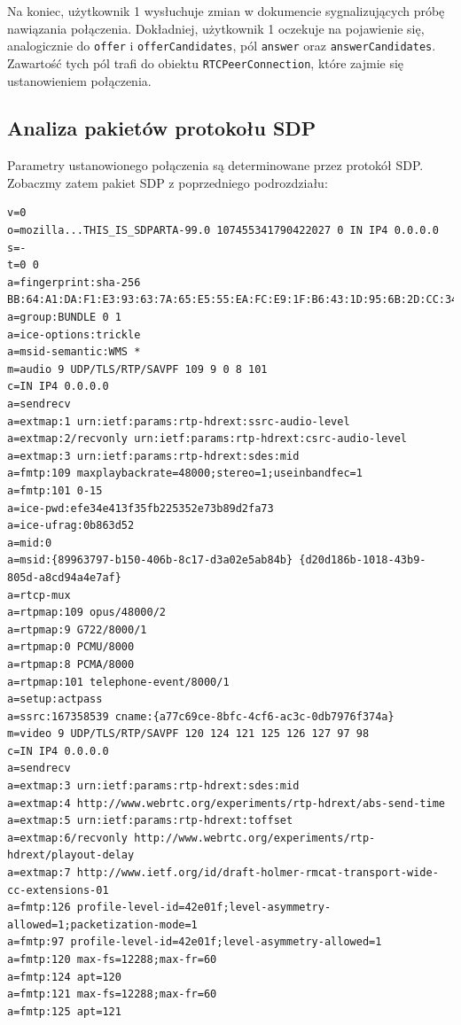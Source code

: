 Na koniec, użytkownik 1 wysłuchuje zmian w dokumencie sygnalizujących próbę nawiązania połączenia. Dokładniej,
użytkownik 1 oczekuje na pojawienie się, analogicznie do \verb|offer| i \verb|offerCandidates|, pól \verb|answer| oraz
\verb|answerCandidates|. Zawartość tych pól trafi do obiektu \verb|RTCPeerConnection|, które zajmie się ustanowieniem połączenia.


\subsection{Analiza pakietów protokołu SDP}

Parametry ustanowionego połączenia są determinowane przez protokół SDP. Zobaczmy zatem pakiet SDP z poprzedniego
podrozdziału:

\begin{lstlisting}[label=list:call-doc-1, caption=Opis oferty połączenia SDP,
basicstyle=\footnotesize \ttfamily, showtabs=true, tabsize=4]
v=0
o=mozilla...THIS_IS_SDPARTA-99.0 107455341790422027 0 IN IP4 0.0.0.0
s=-
t=0 0
a=fingerprint:sha-256 BB:64:A1:DA:F1:E3:93:63:7A:65:E5:55:EA:FC:E9:1F:B6:43:1D:95:6B:2D:CC:34:3B:67:C9:EB:EE:80:43:3D
a=group:BUNDLE 0 1
a=ice-options:trickle
a=msid-semantic:WMS *
m=audio 9 UDP/TLS/RTP/SAVPF 109 9 0 8 101
c=IN IP4 0.0.0.0
a=sendrecv
a=extmap:1 urn:ietf:params:rtp-hdrext:ssrc-audio-level
a=extmap:2/recvonly urn:ietf:params:rtp-hdrext:csrc-audio-level
a=extmap:3 urn:ietf:params:rtp-hdrext:sdes:mid
a=fmtp:109 maxplaybackrate=48000;stereo=1;useinbandfec=1
a=fmtp:101 0-15
a=ice-pwd:efe34e413f35fb225352e73b89d2fa73
a=ice-ufrag:0b863d52
a=mid:0
a=msid:{89963797-b150-406b-8c17-d3a02e5ab84b} {d20d186b-1018-43b9-805d-a8cd94a4e7af}
a=rtcp-mux
a=rtpmap:109 opus/48000/2
a=rtpmap:9 G722/8000/1
a=rtpmap:0 PCMU/8000
a=rtpmap:8 PCMA/8000
a=rtpmap:101 telephone-event/8000/1
a=setup:actpass
a=ssrc:167358539 cname:{a77c69ce-8bfc-4cf6-ac3c-0db7976f374a}
m=video 9 UDP/TLS/RTP/SAVPF 120 124 121 125 126 127 97 98
c=IN IP4 0.0.0.0
a=sendrecv
a=extmap:3 urn:ietf:params:rtp-hdrext:sdes:mid
a=extmap:4 http://www.webrtc.org/experiments/rtp-hdrext/abs-send-time
a=extmap:5 urn:ietf:params:rtp-hdrext:toffset
a=extmap:6/recvonly http://www.webrtc.org/experiments/rtp-hdrext/playout-delay
a=extmap:7 http://www.ietf.org/id/draft-holmer-rmcat-transport-wide-cc-extensions-01
a=fmtp:126 profile-level-id=42e01f;level-asymmetry-allowed=1;packetization-mode=1
a=fmtp:97 profile-level-id=42e01f;level-asymmetry-allowed=1
a=fmtp:120 max-fs=12288;max-fr=60
a=fmtp:124 apt=120
a=fmtp:121 max-fs=12288;max-fr=60
a=fmtp:125 apt=121

\end{lstlisting}
